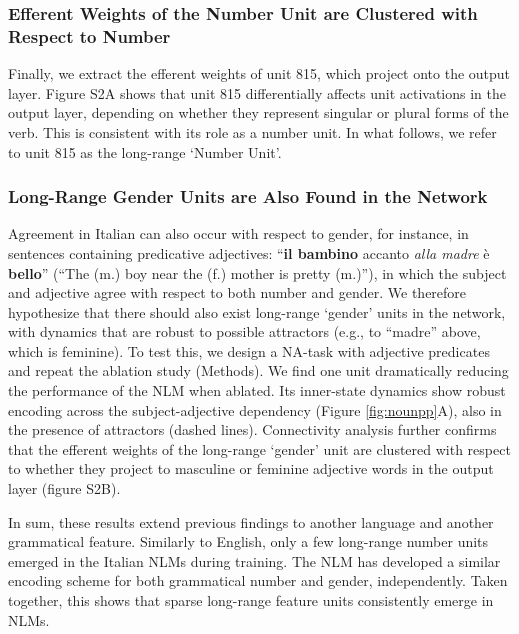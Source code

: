 \subsubsection{Efferent Weights of the Number Unit are Clustered with Respect to Number}
Finally, we extract the efferent weights of unit 815, which project onto the output layer. Figure S2A shows that unit 815 differentially affects unit activations in the output layer, depending on whether they represent singular or plural forms of the verb. This is consistent with its role as a number unit. In what follows, we refer to unit 815 as the long-range `Number Unit'.

\subsubsection{Long-Range Gender Units are Also Found in the Network }
Agreement in Italian can also occur with respect to gender, for instance, in sentences containing predicative adjectives: ``\textbf{il bambino} accanto \emph{alla madre} \`{e} \textbf{bello}'' (``The (m.) boy near the (f.) mother is pretty (m.)''), in which the subject and adjective agree with respect to both number and gender. We therefore hypothesize that there should also exist long-range `gender' units in the network, with dynamics that are robust to possible attractors (e.g., to ``madre'' above, which is feminine). 
To test this, we design a NA-task with adjective predicates and repeat the ablation study (Methods). 
We find one unit dramatically reducing the performance of the NLM when ablated. Its inner-state dynamics show robust encoding across the subject-adjective dependency (Figure \ref{fig:nounpp}A), also in the presence of attractors (dashed lines). Connectivity analysis further confirms that the efferent weights of the long-range `gender' unit are clustered with respect to whether they project to masculine or feminine adjective words in the output layer (figure S2B).

\vspace{10pt}
In sum, these results extend previous findings to another language and another grammatical feature. Similarly to English, only a few long-range number units emerged in the Italian NLMs during training. The NLM has developed a similar encoding scheme for both grammatical number and gender, independently. Taken together, this shows that sparse long-range feature units consistently emerge in NLMs.


